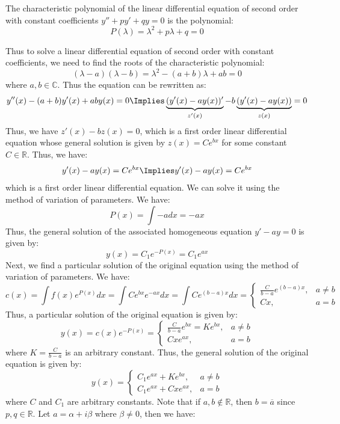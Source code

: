 \begin{definition}
    The characteristic polynomial of the linear differential equation of second order with constant coefficients $y'' + py' + qy = 0$ is the polynomial:
    \[
        P(\lambda) = \lambda^2 + p\lambda + q = 0
    \]
\end{definition}
Thus to solve a linear differential equation of second order with constant coefficients, we need to find the roots of the characteristic polynomial:
\[
    (\lambda - a) (\lambda - b) = \lambda^2 - (a + b) \lambda + ab = 0
\]
where $a,b \in \mathbb{C}$. Thus the equation can be rewritten as:
\[
    y''(x) - (a + b)y'(x) + aby(x) = 0 \Implies \underbrace{(y'(x) - ay(x))'}_{z'(x)} - b\underbrace{(y'(x)-ay(x))}_{z(x)} = 0
\]
Thus, we have $z'(x) - bz(x) = 0$, which is a first order linear differential equation whose general solution is given by $z(x) = C e^{bx}$ for some constant $C \in \mathbb{R}$. Thus, we have:
\[
    y'(x) - ay(x) = C e^{bx} \Implies y'(x) - ay(x) = C e^{bx}
\]
which is a first order linear differential equation. We can solve it using the method of variation of parameters. We have:
\[
    P(x) = \int -a dx = -ax
\]
Thus, the general solution of the associated homogeneous equation $y' - ay = 0$ is given by:
\[
    y(x) = C_1e^{-P(x)} = C_1e^{ax}
\]
Next, we find a particular solution of the original equation using the method of variation of parameters. We have:
\[
    c(x) = \int f(x) e^{P(x)} dx = \int C e^{bx} e^{-ax} dx = \int C e^{(b - a)x} dx = \begin{cases}
    \frac{C}{b - a} e^{(b - a)x}, & a \neq b \\
    Cx, & a = b
    \end{cases}
\]
Thus, a particular solution of the original equation is given by:
\[
    y(x) = c(x) e^{-P(x)} = \begin{cases}
    \frac{C}{b - a} e^{bx} = K e^{bx}, & a \neq b \\
    Cx e^{ax}, & a = b
    \end{cases}
\]
where $K = \frac{C}{b - a}$ is an arbitrary constant. Thus, the general solution of the original equation is given by:
\[
    y(x) = \begin{cases}
    C_1 e^{ax} + K e^{bx}, & a \neq b \\
    C_1 e^{ax} + C x e^{ax}, & a = b
    \end{cases}
\]
where $C$ and $C_1$ are arbitrary constants. Note that if $a,b \notin \mathbb{R}$, then $b = \overline{a}$ since $p,q \in \mathbb{R}$. Let $a = \alpha + i\beta$ where $\beta \neq 0$, then we have:

